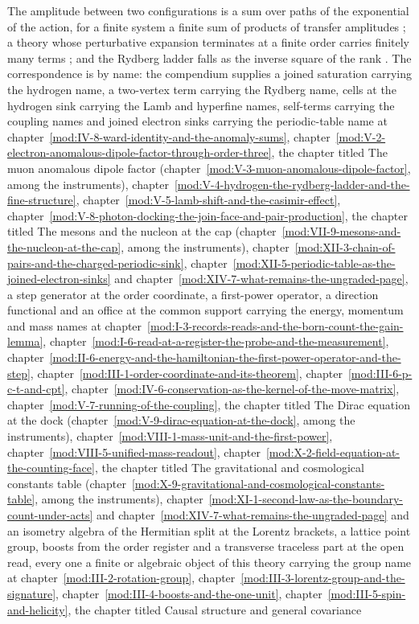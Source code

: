 \begin{chbridge}
The amplitude between two configurations is a sum over paths of the exponential of the action, for a finite system a finite sum of products of transfer amplitudes \cite{Feynman1948}; a theory whose perturbative expansion terminates at a finite order carries finitely many terms \cite{Peskin1995}; and the Rydberg ladder falls as the inverse square of the rank \cite{Dirac1958}. The correspondence is by name: the compendium supplies a joined saturation carrying the hydrogen name, a two-vertex term carrying the Rydberg name, cells at the hydrogen sink carrying the Lamb and hyperfine names, self-terms carrying the coupling names and joined electron sinks carrying the periodic-table name at chapter~\ref{mod:IV-8-ward-identity-and-the-anomaly-sums}, chapter~\ref{mod:V-2-electron-anomalous-dipole-factor-through-order-three}, the chapter titled The muon anomalous dipole factor (chapter~\ref{mod:V-3-muon-anomalous-dipole-factor}, among the instruments), chapter~\ref{mod:V-4-hydrogen-the-rydberg-ladder-and-the-fine-structure}, chapter~\ref{mod:V-5-lamb-shift-and-the-casimir-effect}, chapter~\ref{mod:V-8-photon-docking-the-join-face-and-pair-production}, the chapter titled The mesons and the nucleon at the cap (chapter~\ref{mod:VII-9-mesons-and-the-nucleon-at-the-cap}, among the instruments), chapter~\ref{mod:XII-3-chain-of-pairs-and-the-charged-periodic-sink}, chapter~\ref{mod:XII-5-periodic-table-as-the-joined-electron-sinks} and chapter~\ref{mod:XIV-7-what-remains-the-ungraded-page}, a step generator at the order coordinate, a first-power operator, a direction functional and an office at the common support carrying the energy, momentum and mass names at chapter~\ref{mod:I-3-records-reads-and-the-born-count-the-gain-lemma}, chapter~\ref{mod:I-6-read-at-a-register-the-probe-and-the-measurement}, chapter~\ref{mod:II-6-energy-and-the-hamiltonian-the-first-power-operator-and-the-step}, chapter~\ref{mod:III-1-order-coordinate-and-its-theorem}, chapter~\ref{mod:III-6-p-c-t-and-cpt}, chapter~\ref{mod:IV-6-conservation-as-the-kernel-of-the-move-matrix}, chapter~\ref{mod:V-7-running-of-the-coupling}, the chapter titled The Dirac equation at the dock (chapter~\ref{mod:V-9-dirac-equation-at-the-dock}, among the instruments), chapter~\ref{mod:VIII-1-mass-unit-and-the-first-power}, chapter~\ref{mod:VIII-5-unified-mass-readout}, chapter~\ref{mod:X-2-field-equation-at-the-counting-face}, the chapter titled The gravitational and cosmological constants table (chapter~\ref{mod:X-9-gravitational-and-cosmological-constants-table}, among the instruments), chapter~\ref{mod:XI-1-second-law-as-the-boundary-count-under-acts} and chapter~\ref{mod:XIV-7-what-remains-the-ungraded-page} and an isometry algebra of the Hermitian split at the Lorentz brackets, a lattice point group, boosts from the order register and a transverse traceless part at the open read, every one a finite or algebraic object of this theory carrying the group name at chapter~\ref{mod:III-2-rotation-group}, chapter~\ref{mod:III-3-lorentz-group-and-the-signature}, chapter~\ref{mod:III-4-boosts-and-the-one-unit}, chapter~\ref{mod:III-5-spin-and-helicity}, the chapter titled Causal structure and general covariance 
\end{chbridge}
